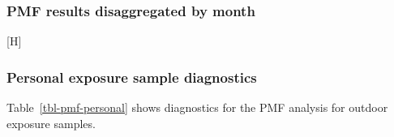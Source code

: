 \documentclass[
  letterpaper,
  DIV=11,
  numbers=noendperiod]{scrartcl}
\makeatletter
\renewenvironment{figure}%
   {\renewcommand\familydefault\sfdefault
    \@float{figure}}
   {\end@float}
\makeatother
\begin{document}
\subsubsection{PMF results disaggregated by
month}\label{pmf-results-disaggregated-by-month}

\begin{figure}[H]

\caption{\label{fig-pmf-sup-month}Mass concentrations (ug/m3) of
contributions to PM2.5 mass by each of the four named sources identified
in the source analysis. From left to right, the source contributions
represented are `sulfur secondary', `mixed combustion', `dust', and
`transported dust'. Source contribution mass concentrations are shown by
month (November, December, January) and color-coded by district, with
purple for Fangshan, blue for Huairou, green for Mentougou, and yellow
for Miyun.}


\end{figure}%

\newpage

\subsubsection{Personal exposure sample
diagnostics}\label{personal-exposure-sample-diagnostics}

Table~\ref{tbl-pmf-personal} shows diagnostics for the PMF analysis for
outdoor exposure samples.
\end{document}
